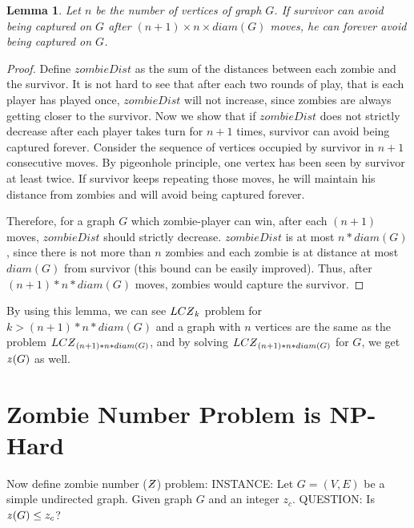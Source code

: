 \documentclass[1p]{elsarticle}
\newtheorem{lemma}[theorem]{Lemma}
\newcommand{\NPZ}{\ooalign{$Z$\cr\hfil\rule[.8ex]{.3em}{.09ex}\hfil\cr}}
\newcommand{\zn}{\ooalign{$z$\cr\hfil\rule[.5ex]{.2em}{.08ex}\hfil\cr}}
\begin{document}
	\begin{lemma}
		\label{limit-moves}
		Let $n$ be the number of vertices of graph $G$. If survivor can avoid being captured on $G$ after $(n + 1)
		\times n \times diam(G)$ moves, he can forever avoid being captured on $G$.
	\end{lemma}
	\begin{proof}
		Define $zombieDist$ as the sum of the distances between each zombie and the survivor. It is not hard to see that
		after each two rounds of play, that is each player has played once, $zombieDist$ will not increase, since
		zombies are always getting closer to the survivor. Now we show that if $zombieDist$ does not strictly decrease
		after each player takes turn for $n + 1$ times, survivor can avoid being captured forever. Consider the sequence
		of vertices occupied by survivor in $n + 1$ consecutive moves. By pigeonhole principle, one vertex has been seen
		by survivor at least twice. If survivor keeps repeating those moves, he will maintain his distance from zombies
		and will avoid being captured forever.

		Therefore, for a graph $G$ which zombie-player can win, after each $(n + 1)$ moves, $zombieDist$ should strictly
		decrease. $zombieDist$ is at most $n * diam(G)$, since there is not more than $n$ zombies and each zombie is at distance
		at most $diam(G)$ from survivor (this bound can be easily improved). Thus, after $(n + 1) * n * diam(G)$ moves, zombies would
		capture the survivor.
	\end{proof}

	By using this lemma, we can see $LC\NPZ_k$ problem for $k > (n + 1) * n * diam(G)$ and a graph with $n$ vertices are the same as
	the problem $LC\NPZ_{(n + 1) * n * diam(G)}$, and by solving $LC\NPZ_{(n + 1) * n * diam(G)}$ for $G$, we get $\zn(G)$ as well.


	
	\section{Zombie Number Problem is NP-Hard}\label{np-zombienumber}

	Now define zombie number ($\NPZ$) problem:
	{\newline}
	INSTANCE: Let $G = (V,E)$ be a simple undirected graph. Given graph $G$ and an integer $z_c$.
	{\newline}
	QUESTION: Is $\zn (G) \leq z_c$?
\end{document}
